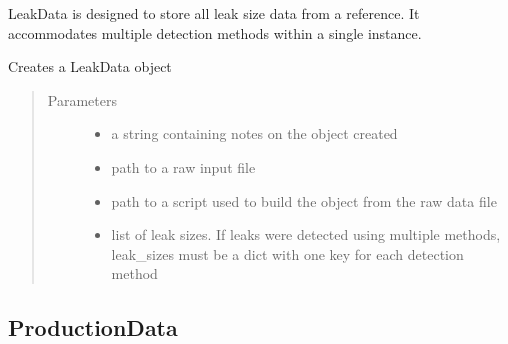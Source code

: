 \documentclass[letterpaper,10pt,english]{sphinxmanual}
\begin{document}
\begin{fulllineitems}
\label{\detokenize{index:feast.input_data_classes.LeakData}}
LeakData is designed to store all leak size data from a reference. It accommodates multiple detection methods
within a single instance.

Creates a LeakData object
\begin{quote}\begin{description}
\item[{Parameters}] \leavevmode\begin{itemize}
\item {} 
 \textendash{} a string containing notes on the object created

\item {} 
 \textendash{} path to a raw input file

\item {} 
 \textendash{} path to a script used to build the object from the raw data file

\item {} 
 \textendash{} list of leak sizes. If leaks were detected using multiple methods, leak\_sizes must be a dict
with one key for each detection method

\end{itemize}

\end{description}\end{quote}

\end{fulllineitems}



\subsection{ProductionData}
\label{\detokenize{index:productiondata}}
\end{document}
